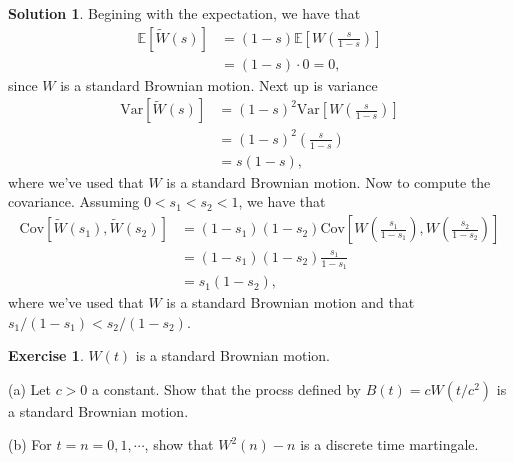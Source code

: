 \documentclass[12pt]{article}
\newcommand{\Expect}{\mathbb{E}}
\newcommand{\Var}{\text{Var}}
\newcommand{\Cov}{\text{Cov}}
\theoremstyle{definition}
\newtheorem{exer}{Exercise}
\newtheorem{sol}{Solution}
\theoremstyle{remark}
\begin{document}
\begin{sol}
Begining with the expectation, we have that
\begin{align*}
    \Expect[\tilde{W}(s)] &= (1-s) \Expect \left[W\left(\frac{s}{1-s}\right)\right]\\ 
                          &= (1 - s) \cdot 0 = 0,
\end{align*}
since $W$ is a standard Brownian motion. Next up is variance
\begin{align*}
    \Var[ \tilde{W}(s)] &= (1 - s)^{2} \Var\left[ W\left( \frac{s}{1 - s}\right) \right]\\
                        &= (1 - s)^{2} \left( \frac{s}{1 - s} \right)\\
                        &= s(1 - s),
\end{align*}
where we've used that $W$ is a standard Brownian motion.
Now to compute the covariance. Assuming $0 < s_{1} < s_{2} < 1$, we have that
\begin{align*}
    \Cov\left[\tilde{W}(s_{1}), \tilde{W}(s_{2})\right] &= (1-s_{1})(1-s_{2}) \Cov\left[ W\left( \frac{s_{1}}{1-s_{1}}\right), W\left( \frac{s_{2}}{1-s_{2}} \right)\right]\\
                                                        &= (1-s_{1})(1-s_{2}) \frac{s_{1}}{1-s_{1}}\\
                                                        &=s_{1} (1-s_{2}),
\end{align*}
where we've used that $W$ is a standard Brownian motion and that $s_{1} / (1 - s_{1}) < s_{2} / (1 - s_{2})$.
\end{sol}
\newpage

\begin{exer}
$W(t)$ is a standard Brownian motion.

(a) Let $c>0$ a constant.
Show that the procss defined by $B(t)=cW(t/c^2)$ is a standard 
Brownian motion.

(b) For $t=n=0,1,\cdots$, show that $W^2(n)-n$ is a discrete time martingale.
\end{exer}
\end{document}
